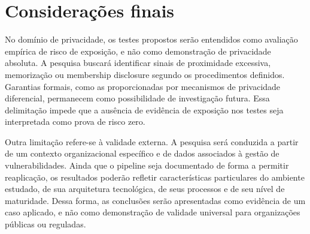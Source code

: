 
\section{Considerações finais}

No domínio de privacidade, os testes propostos serão entendidos como avaliação
empírica de risco de exposição, e não como demonstração de privacidade absoluta.
A pesquisa buscará identificar sinais de proximidade excessiva, memorização ou
membership disclosure segundo os procedimentos definidos. Garantias formais, como
as proporcionadas por mecanismos de privacidade diferencial, permanecem como
possibilidade de investigação futura. Essa delimitação impede que a ausência de
evidência de exposição nos testes seja interpretada como prova de risco zero.

Outra limitação refere-se à validade externa. A pesquisa será conduzida a partir
de um contexto organizacional específico e de dados associados à gestão de
vulnerabilidades. Ainda que o pipeline seja documentado de forma a permitir
reaplicação, os resultados poderão refletir características particulares do
ambiente estudado, de sua arquitetura tecnológica, de seus processos e de seu
nível de maturidade. Dessa forma, as conclusões serão apresentadas como evidência
de um caso aplicado, e não como demonstração de validade universal para
organizações públicas ou reguladas.
